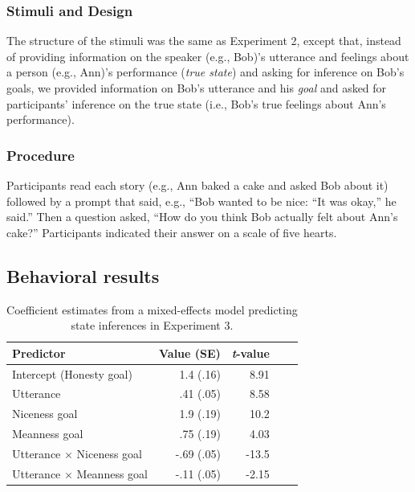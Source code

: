 \documentclass[10pt,letterpaper]{article}
\newcommand{\ndg}[1]{\textcolor{Green}{[ndg: #1]}}
\begin{document}
\subsubsection{Stimuli and Design}

The structure of the stimuli was the same as Experiment 2, except that, instead of providing information on the speaker (e.g., Bob)'s utterance and feelings about a person (e.g., Ann)'s performance (\emph{true state}) and asking for inference on Bob's goals, we provided information on Bob's utterance and his \emph{goal} and asked for participants' inference on the true state (i.e., Bob's true feelings about Ann's performance).

\subsubsection{Procedure}
Participants read each story (e.g., Ann baked a cake and asked Bob about it) followed by a prompt that said, 
e.g., ``Bob wanted to be nice: ``It was okay,'' he said.''
Then a question asked, ``How do you think Bob actually felt about Ann's cake?''
Participants indicated their answer on a scale of five hearts.

\subsection{Behavioral results}


\begin{table}[t]
\caption{\label{tab:lmer2}  Coefficient estimates from a mixed-effects model predicting state inferences in Experiment 3.} 
\begin{center} 
\begin{tabular}{l r r r l} 
\hline
Predictor  &  Value (SE) & \emph{t}-value\\
\hline
Intercept (Honesty goal)  & 1.4 (.16) & 8.91 \\
Utterance & .41 (.05) &  8.58 \\
Niceness goal  & 1.9 (.19) & 10.2 \\
Meanness goal & .75 (.19) & 4.03 \\
Utterance $\times$ Niceness goal & -.69 (.05) & -13.5 \\
Utterance $\times$ Meanness goal & -.11 (.05) & -2.15 \\
\hline
\end{tabular} 
\end{center} 
\end{table}
\end{document}

